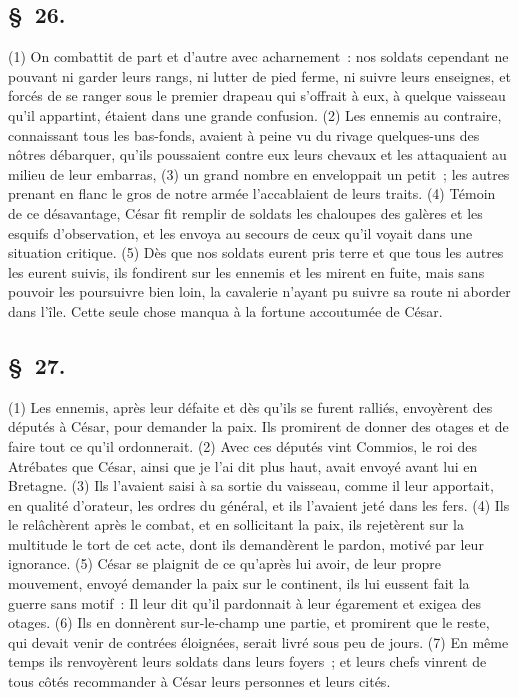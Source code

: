 \documentclass[french,twoside]{book} %
\begin{document}
\subsection[{§ 26.}]{ \textsc{§ 26.} }
\noindent (1) On combattit de part et d’autre avec acharnement : nos soldats cependant ne pouvant ni garder leurs rangs, ni lutter de pied ferme, ni suivre leurs enseignes, et forcés de se ranger sous le premier drapeau qui s’offrait à eux, à quelque vaisseau qu’il appartint, étaient dans une grande confusion. (2) Les ennemis au contraire, connaissant tous les bas-fonds, avaient à peine vu du rivage quelques-uns des nôtres débarquer, qu’ils poussaient contre eux leurs chevaux et les attaquaient au milieu de leur embarras, (3) un grand nombre en enveloppait un petit ; les autres prenant en flanc le gros de notre armée l’accablaient de leurs traits. (4) Témoin de ce désavantage, César fit remplir de soldats les chaloupes des galères et les esquifs d’observation, et les envoya au secours de ceux qu’il voyait dans une situation critique. (5) Dès que nos soldats eurent pris terre et que tous les autres les eurent suivis, ils fondirent sur les ennemis et les mirent en fuite, mais sans pouvoir les poursuivre bien loin, la cavalerie n’ayant pu suivre sa route ni aborder dans l’île. Cette seule chose manqua à la fortune accoutumée de César.
\subsection[{§ 27.}]{ \textsc{§ 27.} }
\noindent (1) Les ennemis, après leur défaite et dès qu’ils se furent ralliés, envoyèrent des députés à César, pour demander la paix. Ils promirent de donner des otages et de faire tout ce qu’il ordonnerait. (2) Avec ces députés vint Commios, le roi des Atrébates que César, ainsi que je l’ai dit plus haut, avait envoyé avant lui en Bretagne. (3) Ils l’avaient saisi à sa sortie du vaisseau, comme il leur apportait, en qualité d’orateur, les ordres du général, et ils l’avaient jeté dans les fers. (4) Ils le relâchèrent après le combat, et en sollicitant la paix, ils rejetèrent sur la multitude le tort de cet acte, dont ils demandèrent le pardon, motivé par leur ignorance. (5) César se plaignit de ce qu’après lui avoir, de leur propre mouvement, envoyé demander la paix sur le continent, ils lui eussent fait la guerre sans motif : Il leur dit qu’il pardonnait à leur égarement et exigea des otages. (6) Ils en donnèrent sur-le-champ une partie, et promirent que le reste, qui devait venir de contrées éloignées, serait livré sous peu de jours. (7) En même temps ils renvoyèrent leurs soldats dans leurs foyers ; et leurs chefs vinrent de tous côtés recommander à César leurs personnes et leurs cités.
\end{document}
